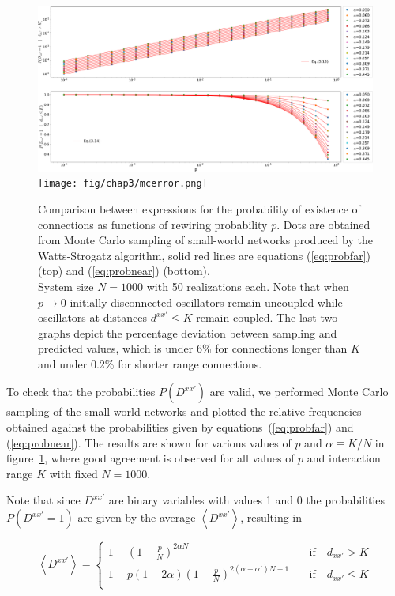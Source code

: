\begin{figure}
  \centering
  \includegraphics[width=\linewidth]{fig/rewire_mc.png}
  \texttt{[image: fig/chap3/mcerror.png]}
  \caption{
		Comparison between expressions for the probability of existence of connections as functions of rewiring probability $p$.  Dots are
		obtained from Monte Carlo sampling of small-world networks produced by the Watts-Strogatz algorithm, solid red lines are equations
		(\ref{eq:probfar}) (top) and (\ref{eq:probnear}) (bottom). \\ System size $N=1000$ with 50 realizations each. Note that when $p\to
		0$ initially disconnected oscillators remain uncoupled while oscillators at distances $d^{xx'}\leq K$ remain coupled.  The last two
		graphs depict the percentage deviation between sampling and predicted values, which is under 6\% for connections longer than $K$
		and under 0.2\% for shorter range connections.
	}
  \label{fig:rewire_mc}
\end{figure}

To check that the probabilities $P(D^{xx'})$ are valid, we performed Monte Carlo sampling of the small-world networks and plotted the
relative frequencies obtained against the probabilities given by equations~(\ref{eq:probfar}) and (\ref{eq:probnear}). The results are
shown for various values of $p$ and $\alpha \equiv K/N$ in figure~\ref{fig:rewire_mc}, where good agreement is observed for all values
of $p$ and interaction range $K$ with fixed $N=1000$.

Note that since $D^{xx'}$ are binary variables with values 1 and 0 the probabilities $P(D^{xx'}=1)$ are given by the average
$\left<D^{xx'}\right>$, resulting in

\begin{equation}
  \left<D^{xx'}\right> =
  \begin{cases}
    1-\left( 1 - \frac{p}{N} \right)^{2\alpha N} \quad &\text{if} \quad d_{xx'}>K \\
    1-p\left( 1 - 2\alpha \right)\left( 1 - \frac{p}{N} \right)^{2(\alpha-\alpha')N+1} \quad &\text{if} \quad d_{xx'}\leq K\\
  \end{cases}
  \label{eq:probconnection}
\end{equation}

